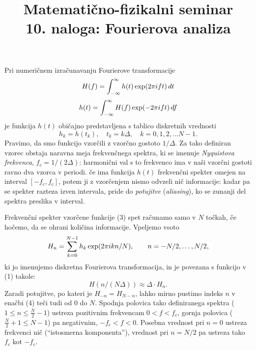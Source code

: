 \documentclass[slovene,11pt,a4paper]{article}
\title{
\sc\large Matematično-fizikalni seminar \thisyear\\
\bigskip
\bf 10. naloga: Fourierova analiza}
\author{}
\date{}
\begin{document}
\maketitle
\vspace{-1cm}


Pri numeričnem izračunavanju Fourierove transformacije
\begin{equation}
H(f) = \int_{-\infty}^\infty
h(t)\,{\rm exp}(2 \pi i f t)\,dt
\end{equation}
\begin{equation}
h(t) = \int_{-\infty}^\infty
H(f)\,{\rm exp}(-2 \pi i f t)\,df
\end{equation}
je funkcija $h(t)$ običajno predstavljena s tablico diskretnih
vrednosti
\begin{equation}
h_k = h(t_k),\quad t_k = k \Delta, \quad k=0,1,2,\dots N-1.
\end{equation}
Pravimo, da smo funkcijo vzorčili z vzorčno gostoto $1/\Delta$.
Za tako definiran vzorec obstaja naravna meja frekvenčnega spektra,
ki se imenuje {\sl Nyquistova frekvenca}, $f_c =1/(2\Delta)$:
harmonični val s to frekvenco ima v naši vzorčni gostoti ravno
dva vzorca v periodi.
če ima funkcija $h(t)$ frekvenčni spekter omejen na interval
$[-f_c ,f_c ]$, potem ji z vzorčenjem nismo odvzeli nič informacije:
kadar pa se spekter razteza izven intervala, pride do {\sl potujitve\/}
({\sl aliasing\/}), ko se zunanji del spektra preslika v interval.

Frekvenčni spekter vzorčene funkcije (3) spet računamo samo
v $N$ točkah, če hočemo, da se ohrani količina informacije.
Vpeljemo vsoto
\begin{equation}
H_n = \sum_{k=0}^{N-1}
h_k\, {\rm exp}(2 \pi i k n / N),
\qquad n=-N/2,\dots ,N/2,
\end{equation}
ki jo imenujemo diskretna Fourierova transformacija, in je povezana
s funkcijo v (1) takole:
\[
H(n/(N\Delta)) \approx \Delta\cdot H_n .
\]
Zaradi potujitve, po kateri je $H_{-n} = H_{N-n}$, lahko mirno pustimo
indeks $n$ v enačbi (4) teči tudi od 0 do $N$. Spodnja polovica
tako definiranega spektra ($1 \le n \le \tfrac{N}{2}-1$) ustreza pozitivnim
frekvencam $0 < f < f_c$, gornja polovica ($\tfrac{N}{2}+1 \le N-1$)
pa negativnim, $-f_c < f < 0$.  Posebna vrednost pri $n=0$
ustreza frekvenci nič (``istosmerna komponenta''), vrednost
pri $n=N/2$ pa ustreza tako $f_c$ kot $-f_c$.
\end{document}
